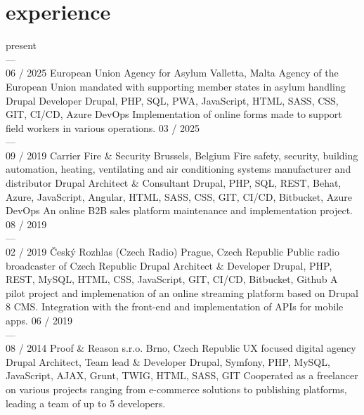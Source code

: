 \documentclass[]{friggeri-cv} %
\begin{document}
    \section{experience}
    \begin{entrylist}
        \job
        {present \\ --- \\ 06 / 2025}
        {European Union Agency for Asylum}
        {Valletta, Malta}
        {Agency of the European Union mandated with supporting member states in asylum handling}
        {
            \position
            {Drupal Developer}
            {Drupal, PHP, SQL, PWA, JavaScript, HTML, SASS, CSS, GIT, CI/CD, Azure DevOps}
            {
                Implementation of online forms made to support field workers in various operations.
            }
        }
        \job
        {03 / 2025 \\ --- \\ 09 / 2019}
        {Carrier Fire \& Security}
        {Brussels, Belgium}
        {Fire safety, security, building automation, heating, ventilating and air conditioning systems manufacturer and distributor}
        {
            \position
            {Drupal Architect \& Consultant}
            {Drupal, PHP, SQL, REST, Behat, Azure, JavaScript, Angular, HTML, SASS, CSS, GIT, CI/CD, Bitbucket, Azure DevOps}
            {
                An online B2B sales platform maintenance and implementation project.
            }
        }
        \job
        {08 / 2019 \\ --- \\ 02 / 2019}
        {Český Rozhlas (Czech Radio)}
        {Prague, Czech Republic}
        {Public radio broadcaster of Czech Republic}
        {
            \position
            {Drupal Architect \& Developer}
            {Drupal, PHP, REST, MySQL, HTML, CSS, JavaScript, GIT, CI/CD, Bitbucket, Github}
            {
                A pilot project and implemenation of an online streaming platform based on Drupal 8 CMS. Integration
                with the front-end and implementation of APIs for mobile apps.
            }
        }
        \job
        {06 / 2019 \\ --- \\ 08 / 2014}
        {Proof \& Reason s.r.o.}
        {Brno, Czech Republic}
        {UX focused digital agency}
        {
            \position
            {Drupal Architect, Team lead \& Developer}
            {Drupal, Symfony, PHP, MySQL, JavaScript, AJAX, Grunt, TWIG, HTML, SASS, GIT}
            {
                Cooperated as a freelancer on various projects ranging from e-commerce solutions to publishing platforms, leading a team of up to 5 developers.
}}
\end{entrylist}
\end{document}
